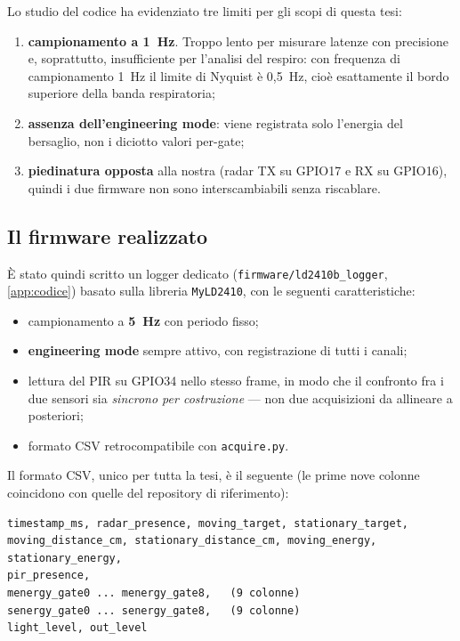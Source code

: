 Lo studio del codice ha evidenziato tre limiti per gli scopi di questa tesi:

\begin{enumerate}[leftmargin=1.8em,itemsep=3pt]
  \item \textbf{campionamento a 1~Hz}. Troppo lento per misurare latenze con
        precisione e, soprattutto, insufficiente per l'analisi del respiro: con
        frequenza di campionamento 1~Hz il limite di Nyquist è 0,5~Hz, cioè
        esattamente il bordo superiore della banda respiratoria;
  \item \textbf{assenza dell'engineering mode}: viene registrata solo l'energia del
        bersaglio, non i diciotto valori per-gate;
  \item \textbf{piedinatura opposta} alla nostra (radar TX su GPIO17 e RX su
        GPIO16), quindi i due firmware non sono interscambiabili senza riscablare.
\end{enumerate}

\subsection{Il firmware realizzato}

È stato quindi scritto un logger dedicato
(\texttt{firmware/ld2410b\_logger}, \cref{app:codice}) basato sulla libreria
\texttt{MyLD2410}, con le seguenti caratteristiche:

\begin{itemize}[leftmargin=1.4em,itemsep=2pt]
  \item campionamento a \textbf{5~Hz} con periodo fisso;
  \item \textbf{engineering mode} sempre attivo, con registrazione di tutti i
        canali;
  \item lettura del PIR su GPIO34 nello stesso frame, in modo che il confronto fra i
        due sensori sia \emph{sincrono per costruzione} --- non due acquisizioni da
        allineare a posteriori;
  \item formato CSV retrocompatibile con \texttt{acquire.py}.
\end{itemize}

Il formato CSV, unico per tutta la tesi, è il seguente (le prime nove colonne
coincidono con quelle del repository di riferimento):

\begin{lstlisting}[caption={Intestazione del CSV prodotto dal logger, in
engineering mode.},label={lst:csv},basicstyle=\ttfamily\scriptsize]
timestamp_ms, radar_presence, moving_target, stationary_target,
moving_distance_cm, stationary_distance_cm, moving_energy, stationary_energy,
pir_presence,
menergy_gate0 ... menergy_gate8,   (9 colonne)
senergy_gate0 ... senergy_gate8,   (9 colonne)
light_level, out_level
\end{lstlisting}


